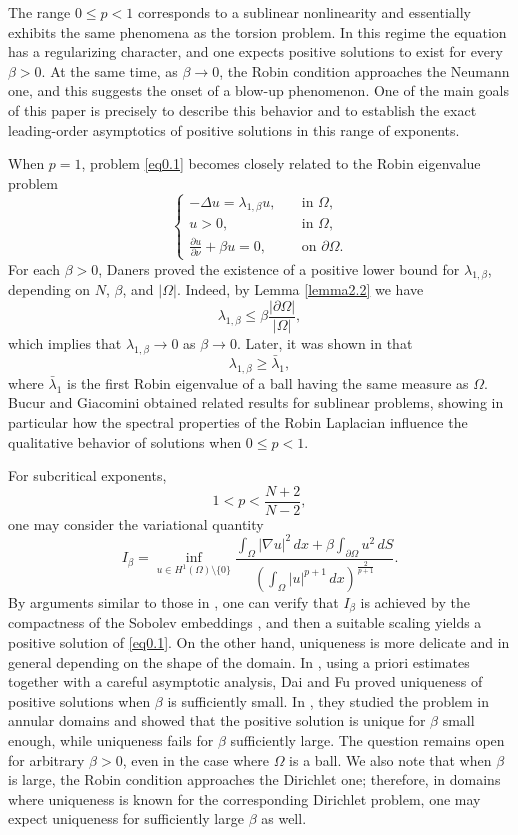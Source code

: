 \documentclass[12pt,reqno]{amsart}
\numberwithin{equation}{section}
\theoremstyle{definition}
\begin{document}
The range $0\le p<1$ corresponds to a sublinear nonlinearity and essentially exhibits the same phenomena as the torsion problem. In this regime the equation has a regularizing character, and one expects positive solutions to exist for every $\beta>0$. At the same time, as $\beta\to0$, the Robin condition approaches the Neumann one, and this suggests the onset of a blow-up phenomenon. One of the main goals of this paper is precisely to describe this behavior and to establish the exact leading-order asymptotics of positive solutions in this range of exponents.

When $p=1$, problem \eqref{eq0.1} becomes closely related to the Robin eigenvalue problem
\begin{equation}\label{1.5}
\begin{cases}
-\Delta u=\lambda_{1,\beta}u,\quad &\text{in }\Omega,\\
u>0,\quad &\text{in }\Omega,\\
\frac{\partial u}{\partial \nu}+\beta u=0,\quad &\text{on }\partial\Omega.
\end{cases}
\end{equation}
For each $\beta>0$, Daners \cite{D1} proved the existence of a positive lower bound for $\lambda_{1,\beta}$, depending on $N$, $\beta$, and $|\Omega|$. Indeed,  by Lemma \ref{lemma2.2} we have  
$$
\lambda_{1,\beta}\le\beta\frac{|\partial\Omega|}{|\Omega|},
$$
which implies that $\lambda_{1,\beta}\to0$ as $\beta\to0$.
Later, it was shown in \cite{D2} that
\[
\lambda_{1,\beta}\ge \bar{\lambda}_1,
\]
where $\bar{\lambda}_1$ is the first Robin eigenvalue of a ball having the same measure as $\Omega$. Bucur and Giacomini \cite{BG} obtained related results for sublinear problems, showing in particular how the spectral properties of the Robin Laplacian influence the qualitative behavior of solutions when $0\le p<1$.

For subcritical exponents,
\[
1<p<\frac{N+2}{N-2},
\]
one may consider the variational quantity
\begin{equation}\label{defIbeta}
I_\beta=\inf_{u\in H^1(\Omega)\setminus\{0\}}
\frac{\int_{\Omega}|\nabla u|^2\,dx+\beta\int_{\partial\Omega}u^2\,dS}
{\left(\int_{\Omega}|u|^{p+1}\,dx\right)^{\frac{2}{p+1}}}.
\end{equation}
By arguments similar to those in \cite{Z}, one can verify that $I_\beta$ is achieved  by the compactness of the Sobolev embeddings
, and then a suitable scaling yields a positive solution of \eqref{eq0.1}. On the other hand, uniqueness is more delicate and  in general depending on the shape of the domain. In \cite{DF}, using a priori estimates together with a careful asymptotic analysis, Dai and Fu proved uniqueness of positive solutions when $\beta$ is sufficiently small. In \cite{FD}, they studied the problem in annular domains and showed that the positive solution is unique for $\beta$ small enough, while uniqueness fails for $\beta$ sufficiently large. The question remains open for arbitrary $\beta>0$, even in the case where $\Omega$ is a ball. We also note that when $\beta$ is large, the Robin condition approaches the Dirichlet one; therefore, in domains where uniqueness is known for the corresponding Dirichlet problem, one may expect uniqueness for sufficiently large $\beta$ as well. 
\end{document}
